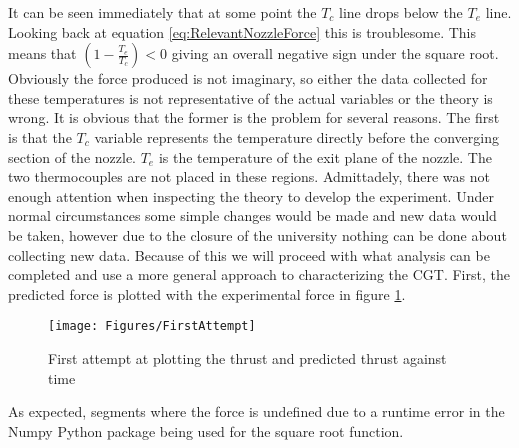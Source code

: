 It can be seen immediately that at some point the $T_c$ line drops below the $T_e$ line. Looking back at equation \ref{eq:RelevantNozzleForce} this is troublesome. This means that $\left(1-\frac{T_e}{T_c}\right)<0$ giving an overall negative sign under the square root. Obviously the force produced is not imaginary, so either the data collected for these temperatures is not representative of the actual variables or the theory is wrong. It is obvious that the former is the problem for several reasons. The first is that the $T_c$ variable represents the temperature directly before the converging section of the nozzle. $T_e$ is the temperature of the exit plane of the nozzle. The two thermocouples are not placed in these regions. Admittadely, there was not enough attention when inspecting the theory to develop the experiment. Under normal circumstances some simple changes would be made and new data would be taken, however due to the closure of the university nothing can be done about collecting new data. Because of this we will proceed with what analysis can be completed and use a more general approach to characterizing the CGT. First, the predicted force is plotted with the experimental force in figure \ref{fig:FirstThrust}. 
\begin{figure}[h!]
\centering
\texttt{[image: Figures/FirstAttempt]}
\caption{First attempt at plotting the thrust and predicted thrust against time}
\label{fig:FirstThrust}
\end{figure}
As expected, segments where the force is undefined due to a runtime error in the Numpy Python package being used for the square root function.

